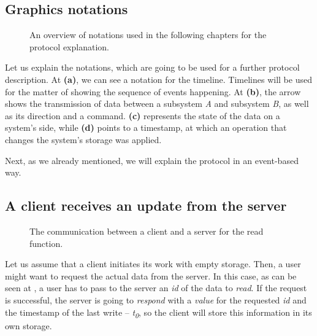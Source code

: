 \subsection*{Graphics notations}

\begin{figure}[!htb]
    \centering
    \def\svgwidth{0.35\linewidth}
    \subfloat[]{{}}%
    \qquad
    \def\svgwidth{0.35\linewidth}
    \subfloat[]{{}}%
 \def\svgwidth{0.35\linewidth}
    \subfloat[]{{}}%
    \qquad
 \def\svgwidth{0.35\linewidth}
    \subfloat[]{{}}%
    \qquad
    \caption{An overview of notations used in the following chapters for the protocol explanation.}%
    \label{fig:notations}%
\end{figure}

Let us explain the notations, which are going to be used for a further protocol description. At  \textbf{(a)}, we can see a notation for the timeline. Timelines will be used for the matter of showing the sequence of events happening. At  \textbf{(b)}, the arrow shows the transmission of data between a subsystem \textit{A} and subsystem \textit{B}, as well as its direction and a command.  \textbf{(c)} represents the state of the data on a system's side, while  \textbf{(d)} points to a timestamp, at which an operation that changes the system's storage was applied.

Next, as we already mentioned, we will explain the protocol in an event-based way. 

\subsection*{A client receives an update from the server}

\begin{figure}[!htb]
    \begin{center}
    \def\svgwidth{\linewidth}
    
    \caption {The communication between a client and a server for the read function.}
    \label{fig:design2}
\end{center}
\end{figure}

Let us assume that a client initiates its work with empty storage. Then, a user might want to request the actual data from the server. In this case, as can be seen at , a user has to pass to the server an \textit{id} of the data to \textit{read}. If the request is successful, the server is going to \textit{respond} with a \textit{value} for the requested \textit{id} and the timestamp of the last write -- \textit{t\textsubscript{0}}, so the client will store this information in its own storage.

